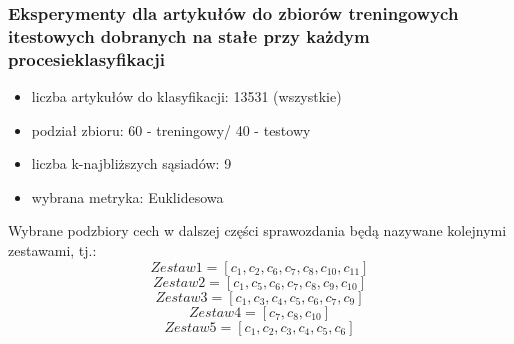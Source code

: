 \documentclass{classrep}
\begin{document}
\subsubsection{Eksperymenty dla artykułów do zbiorów treningowych itestowych dobranych na stałe przy każdym procesieklasyfikacji}
\begin{itemize}
    \item liczba artykułów do klasyfikacji: 13531 (wszystkie)
    \item podział zbioru: 60 - treningowy/ 40 - testowy    
    \item liczba k-najbliższych sąsiadów: 9 
    \item wybrana metryka: Euklidesowa
\end{itemize}
Wybrane podzbiory cech w dalszej części sprawozdania będą nazywane kolejnymi zestawami, tj.:
\begin{equation}
   Zestaw1 = [c_{1}, c_{2}, c_{6}, c_{7}, c_{8}, c_{10}, c_{11}]
\end{equation}
\begin{equation}
   Zestaw2 = [c_{1}, c_{5}, c_{6}, c_{7}, c_{8}, c_{9}, c_{10}]
\end{equation}
\begin{equation}
   Zestaw3 = [c_{1}, c_{3}, c_{4}, c_{5}, c_{6}, c_{7}, c_{9}]
\end{equation}
\begin{equation}
   Zestaw4 = [c_{7}, c_{8}, c_{10}]
\end{equation}
\begin{equation}
   Zestaw5 = [c_{1}, c_{2}, c_{3}, c_{4}, c_{5}, c_{6}]
\end{equation}
\end{document}
